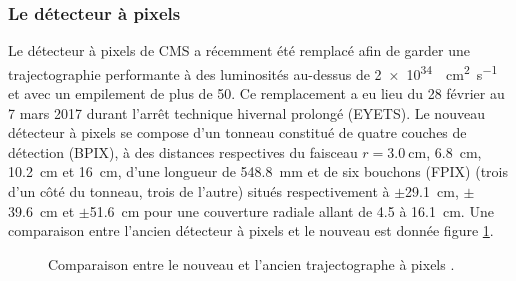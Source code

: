 \subsubsection{Le détecteur à pixels}
Le détecteur à pixels de CMS a récemment été remplacé afin de garder une trajectographie performante à des luminosités au-dessus de \SI{2e34}{\per\square\centi\meter\per\second} et avec un empilement de plus de \num{50}. Ce remplacement a eu lieu du \num{28} février au \num{7} mars \num{2017} durant l'arrêt technique hivernal prolongé (EYETS). Le nouveau détecteur à pixels se compose d'un tonneau constitué de quatre couches de détection (BPIX), à des distances respectives du faisceau $r=\SI{3.0}{\centi\meter}$, \SI{6.8}{\centi\meter}, \SI{10.2}{\centi\meter} et \SI{16}{\centi\meter}, d'une longueur de \SI{548.8}{\milli\meter} et de six bouchons (FPIX) (trois d'un côté du tonneau, trois de l'autre) situés respectivement à $\pm$\SI{29.1}{\centi\meter}, $\pm$\SI{39.6}{\centi\meter} et $\pm$\SI{51.6}{\centi\meter} pour une couverture radiale allant de \num{4.5} à \SI{16.1}{\centi\meter}. Une comparaison entre l'ancien détecteur à pixels et le nouveau est donnée figure \ref{pixel}.

	\begin{figure}[ht!]
	\hfill
	\caption{Comparaison entre le nouveau et l'ancien trajectographe à pixels \cite{Dominguez:1481838}.}
	\label{pixel}
\end{figure}

